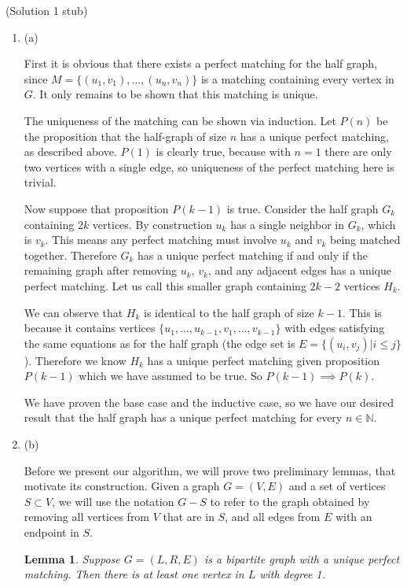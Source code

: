 \documentclass{hmcpset}
\newtheorem{lemma}{Lemma}
\begin{document}
\begin{solution}
(Solution 1 stub)
\begin{enumerate}
\item (a)

First it is obvious that there exists a perfect matching for the half graph, since
$M = \{(u_1,v_1),\ldots,(u_n,v_n)\}$ is a matching containing every vertex in $G$.
It only remains to be shown that this matching is unique.

The uniqueness of the matching can be shown via induction. Let $P(n)$ be the
proposition that the half-graph of size $n$ has a unique perfect matching,
as described above. $P(1)$ is clearly true, because with $n = 1$ there are only
two vertices with a single edge, so uniqueness of the perfect matching here
is trivial.

Now suppose that proposition $P(k - 1)$ is true. Consider the half graph $G_k$
containing $2k$ vertices. By construction $u_k$ has a single neighbor in $G_k$,
which is $v_k$. This means any perfect matching must involve $u_k$ and $v_k$
being matched together. Therefore $G_k$ has a unique perfect matching if and
only if the remaining graph after removing $u_k$, $v_k$, and any adjacent edges
has a unique perfect matching. Let us call this smaller graph containing
$2k -2$ vertices $H_k$.

We can observe that $H_k$ is identical to the half graph of size $k - 1$. This
is because it contains vertices $\{u_1,\ldots,u_{k-1},v_1,\ldots,v_{k-1}\}$ with
edges satisfying the same equations as for the half graph (the edge set is
$E = \{(u_i, v_j) | i \leq j\}$). Therefore we know $H_k$ has a unique perfect
matching given proposition $P(k - 1)$ which we have assumed to be true.
So $P(k - 1) \implies P(k)$.

We have proven the base case and the inductive case, so we have our desired
result that the half graph has a unique perfect matching for every $n \in \mathbb{N}$.


\item (b)

Before we present our algorithm, we will prove two preliminary lemmas, that motivate
its construction. Given a graph $G = (V, E)$ and a set of vertices $S \subset V$,
we will use the notation $G - S$ to refer to the graph obtained by removing all
vertices from $V$ that are in $S$, and all edges from $E$ with an endpoint in $S$.

\begin{lemma}
  Suppose $G = (L, R, E)$ is a bipartite graph with a unique perfect matching. Then
  there is at least one vertex in $L$ with degree 1.
\end{lemma}


\end{enumerate}
\end{solution}
\end{document}
